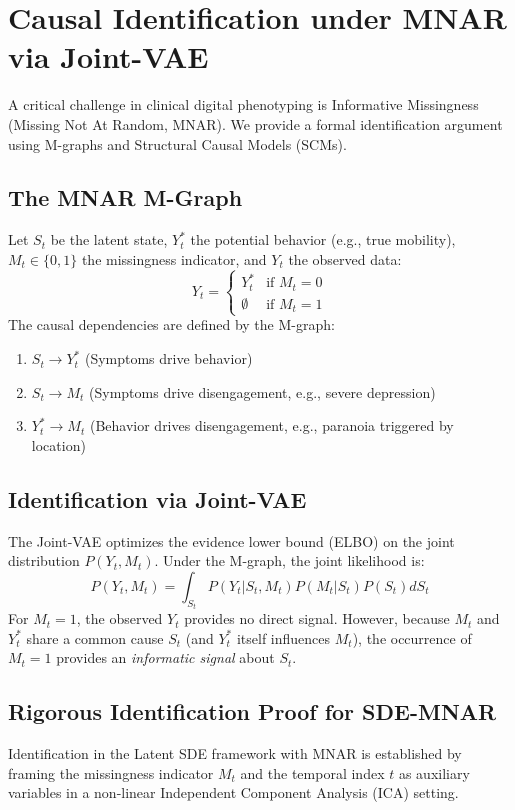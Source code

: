 \documentclass{article}
\begin{document}
\section{Causal Identification under MNAR via Joint-VAE}

A critical challenge in clinical digital phenotyping is Informative Missingness (Missing Not At Random, MNAR). We provide a formal identification argument using M-graphs and Structural Causal Models (SCMs).

\subsection{The MNAR M-Graph}
Let $S_t$ be the latent state, $Y_t^*$ the potential behavior (e.g., true mobility), $M_t \in \{0, 1\}$ the missingness indicator, and $Y_t$ the observed data:
\begin{equation}
    Y_t = \begin{cases} Y_t^* & \text{if } M_t = 0 \\ \emptyset & \text{if } M_t = 1 \end{cases}
\end{equation}
The causal dependencies are defined by the M-graph:
\begin{enumerate}
    \item $S_t \rightarrow Y_t^*$ (Symptoms drive behavior)
    \item $S_t \rightarrow M_t$ (Symptoms drive disengagement, e.g., severe depression)
    \item $Y_t^* \rightarrow M_t$ (Behavior drives disengagement, e.g., paranoia triggered by location)
\end{enumerate}

\subsection{Identification via Joint-VAE}
The Joint-VAE optimizes the evidence lower bound (ELBO) on the joint distribution $P(Y_t, M_t)$. Under the M-graph, the joint likelihood is:
\begin{equation}
    P(Y_t, M_t) = \int_{S_t} P(Y_t | S_t, M_t) P(M_t | S_t) P(S_t) dS_t
\end{equation}
For $M_t = 1$, the observed $Y_t$ provides no direct signal. However, because $M_t$ and $Y_t^*$ share a common cause $S_t$ (and $Y_t^*$ itself influences $M_t$), the occurrence of $M_t=1$ provides an \textit{informatic signal} about $S_t$.

\subsection{Rigorous Identification Proof for SDE-MNAR}
Identification in the Latent SDE framework with MNAR is established by framing the missingness indicator $M_t$ and the temporal index $t$ as auxiliary variables in a non-linear Independent Component Analysis (ICA) setting.
\end{document}
